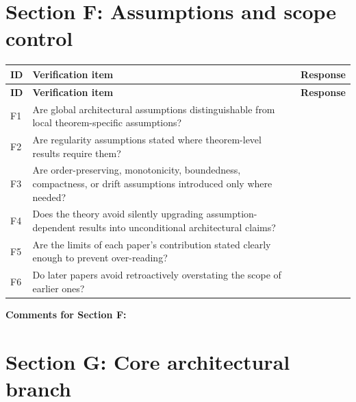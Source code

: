 \documentclass[11pt,a4paper]{article}
\begin{document}
	\section{Section F: Assumptions and scope control}
	
	\begin{longtable}{>{\RaggedRight\arraybackslash}p{}
			>{\RaggedRight\arraybackslash}p{}
			>{\RaggedRight\arraybackslash}p{}}
		\toprule
		\textbf{ID} & \textbf{Verification item} & \textbf{Response} \\
		\midrule
		\endfirsthead
		\toprule
		\textbf{ID} & \textbf{Verification item} & \textbf{Response} \\
		\midrule
		\endhead
		
		F1 & Are global architectural assumptions distinguishable from local theorem-specific assumptions? & \\
		
		F2 & Are regularity assumptions stated where theorem-level results require them? & \\
		
		F3 & Are order-preserving, monotonicity, boundedness, compactness, or drift assumptions introduced only where needed? & \\
		
		F4 & Does the theory avoid silently upgrading assumption-dependent results into unconditional architectural claims? & \\
		
		F5 & Are the limits of each paper's contribution stated clearly enough to prevent over-reading? & \\
		
		F6 & Do later papers avoid retroactively overstating the scope of earlier ones? & \\
		
		\bottomrule
	\end{longtable}
	
	\textbf{Comments for Section F:}
	
	\vspace{3em}
	
	\section{Section G: Core architectural branch}
	
\end{document}
